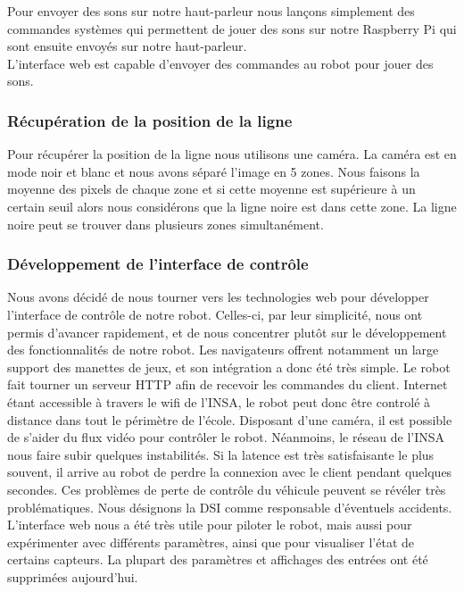 Pour envoyer des sons sur notre haut-parleur nous lançons simplement des commandes systèmes qui permettent de jouer des sons sur notre Raspberry Pi qui sont ensuite envoyés sur notre haut-parleur.
\\
L'interface web est capable d'envoyer des commandes au robot pour jouer des sons.

\subsubsection*{Récupération de la position de la ligne}
Pour récupérer la position de la ligne nous utilisons une caméra. La caméra est en mode noir et blanc et nous avons séparé l'image en 5 zones.
Nous faisons la moyenne des pixels de chaque zone et si cette moyenne est supérieure à un certain seuil alors nous considérons que la ligne noire est dans cette zone. La ligne noire peut se trouver dans plusieurs zones simultanément.



\subsubsection{Développement de l'interface de contrôle}
Nous avons décidé de nous tourner vers les technologies web pour développer l'interface de contrôle de notre robot. Celles-ci, par leur simplicité, nous ont permis d'avancer rapidement, et de nous concentrer plutôt sur le développement des fonctionnalités de notre robot. Les navigateurs offrent notamment un large support des manettes de jeux, et son intégration a donc été très simple.
Le robot fait tourner un serveur HTTP afin de recevoir les commandes du client. Internet étant accessible à travers le wifi de l'INSA, le robot peut donc être controlé à distance dans tout le périmètre de l'école. Disposant d'une caméra, il est possible de s'aider du flux vidéo pour contrôler le robot.
Néanmoins, le réseau de l'INSA nous faire subir quelques instabilités. Si la latence est très satisfaisante le plus souvent, il arrive au robot de perdre la connexion avec le client pendant quelques secondes. Ces problèmes de perte de contrôle du véhicule peuvent se révéler très problématiques. Nous désignons la DSI comme responsable d'éventuels accidents.
L'interface web nous a été très utile pour piloter le robot, mais aussi pour expérimenter avec différents paramètres, ainsi que pour visualiser l'état de certains capteurs. La plupart des paramètres et affichages des entrées ont été supprimées aujourd'hui.

